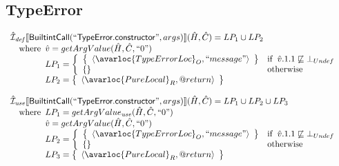 \subsection{TypeError}
\[
\begin{array}{l}

\aI_{\it def}\lbr \SF{BuiltintCall}(``\SF{TypeError.constructor}",args)\rbr(\hat{H},\hat{C})
  = LP_1 \cup LP_2\\
\quad\wherec{
  \hat{v} = getArgValue(\hat{H}, \hat{C}, ``0")\\
  LP_1 = \left\{\begin{array}{ll}
  \set{\langle\avarloc{TypeErrorLoc}_O, ``message"\rangle} & \ifc{\hat{v}.1.1 \not\sqsubseteq \bot_{Undef}}\\
  \set{} & \owc\\
    \end{array}\right.\\
  LP_2 = \set{\langle\avarloc{PureLocal}_R,\varprop{return}\rangle}\\
  }\\
\\

\aI_{\it use}\lbr \SF{BuiltintCall}(``\SF{TypeError.constructor}",args)\rbr(\hat{H},\hat{C})
  = LP_1 \cup LP_2 \cup LP_3\\
\quad\wherec{
  LP_1 = getArgValue_{\it use}(\hat{H}, \hat{C}, ``0")\\
  \hat{v} = getArgValue(\hat{H}, \hat{C}, ``0")\\
  LP_2 = \left\{\begin{array}{ll}
  \set{\langle\avarloc{TypeErrorLoc}_O, ``message"\rangle} & \ifc{\hat{v}.1.1 \not\sqsubseteq \bot_{Undef}}\\
  \set{} & \owc\\
    \end{array}\right.\\
  LP_3 = \set{\langle\avarloc{PureLocal}_R,\varprop{return}\rangle}\\
  }\\
\\

\end{array}
\]


